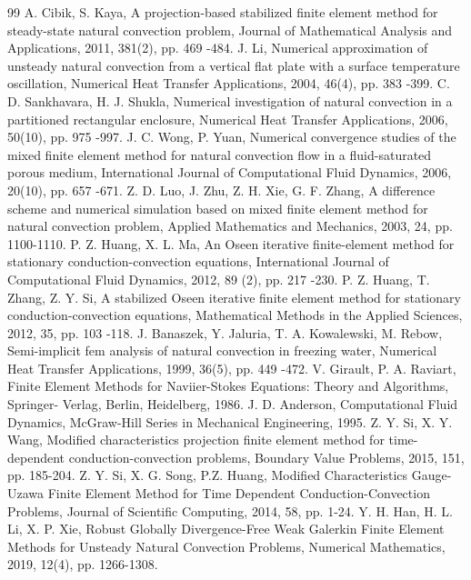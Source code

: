 \documentclass[10pt]{article}
\begin{document}
	\begin{thebibliography}{99}
		 A. Cibik, S. Kaya, A projection-based stabilized finite element method for steady-state natural convection problem, Journal of Mathematical Analysis and Applications, 2011, 381(2), pp. 469 -484.
		 J. Li, Numerical approximation of unsteady natural convection from a vertical flat plate with a surface
		temperature oscillation, Numerical Heat Transfer Applications, 2004, 46(4), pp. 383 -399.
		 C. D. Sankhavara, H. J. Shukla, Numerical investigation of natural convection in a partitioned rectangular enclosure, Numerical Heat Transfer Applications, 2006, 50(10), pp. 975 -997.
		 J. C. Wong, P. Yuan, Numerical convergence studies of the mixed finite element method for natural convection flow in a fluid-saturated porous medium, International Journal of Computational Fluid Dynamics, 2006, 20(10), pp. 657 -671.
		 Z. D. Luo, J. Zhu, Z. H. Xie, G. F. Zhang, A difference scheme and numerical simulation based on mixed finite element method for natural convection problem, Applied Mathematics and Mechanics, 2003, 24, pp. 1100-1110.
		 P. Z. Huang, X. L. Ma, An Oseen iterative finite-element method for stationary conduction-convection
		equations, International Journal of Computational Fluid Dynamics, 2012, 89 (2), pp. 217 -230.
		P. Z. Huang, T. Zhang, Z. Y. Si, A stabilized Oseen iterative finite element method for stationary
		conduction-convection equations, Mathematical Methods in the Applied Sciences, 2012, 35, pp. 103 -118.
		 J. Banaszek, Y. Jaluria, T. A. Kowalewski, M. Rebow, Semi-implicit fem analysis of natural convection in freezing water, Numerical Heat Transfer Applications, 1999, 36(5), pp. 449 -472.
		  V. Girault, P. A. Raviart, Finite Element Methods for Naviier-Stokes Equations: Theory and Algorithms, Springer- 
		Verlag, Berlin, Heidelberg, 1986. 
		  J. D. Anderson, Computational Fluid Dynamics, McGraw-Hill Series in Mechanical Engineering, 1995. 
		 Z. Y. Si, X. Y. Wang, Modified characteristics projection finite element method for time-dependent conduction-convection problems, Boundary Value Problems, 2015, 151, pp. 185-204.
		 Z. Y. Si, X. G. Song, P.Z. Huang, Modified Characteristics Gauge-Uzawa Finite Element Method for Time Dependent Conduction-Convection Problems, Journal of Scientific Computing, 2014, 58, pp. 1-24.
		    Y. H. Han, H. L. Li, X. P. Xie, Robust Globally Divergence-Free Weak Galerkin Finite Element Methods for Unsteady Natural Convection Problems, Numerical Mathematics, 2019, 12(4), pp. 1266-1308.

\end{thebibliography}
\end{document}
